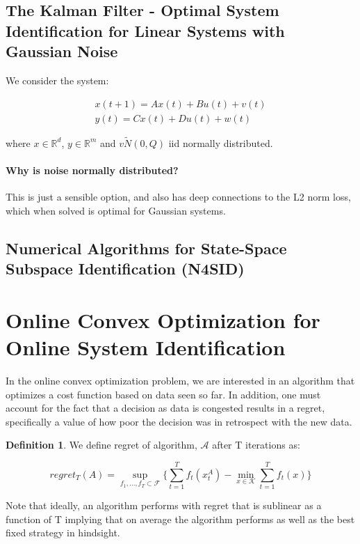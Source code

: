 \documentclass{article}
\theoremstyle{definition}
\newtheorem{definition}{Definition}[section]
\theoremstyle{remark}
\theoremstyle{lemma}
\theoremstyle{theorem}
\theoremstyle{corollary}
\theoremstyle{property}
\begin{document}
	\subsection{The Kalman Filter - Optimal System Identification for Linear Systems with Gaussian Noise}
		We consider the system:

		\begin{align*} 
			x(t+1) = Ax(t) + Bu(t) + v(t) \\ 
			y(t) = Cx(t) + Du(t) + w(t)
		\end{align*}

		where $x \in \mathbb{R}^d$, $y \in \mathbb{R}^m$ and $v \tilde N(0, Q)$ iid normally distributed. 

		\paragraph{Why is noise normally distributed?}
		This is just a sensible option, and also has deep connections to the L2 norm loss, which when solved is optimal for Gaussian systems.

	\subsection{Numerical Algorithms for State-Space Subspace Identification (N4SID)}

\section{Online Convex Optimization for Online System Identification}
	In the online convex optimization problem, we are interested in an algorithm that optimizes a cost function based on data seen so far. In addition, one must account for the fact that a decision as data is congested results in a regret, specifically a value of how poor the decision was in retrospect with the new data.

	\begin{definition}
	\label{def:regret}
		We define regret of algorithm, $\mathcal{A}$ after T iterations as:

			$$regret_T(A) = \sup_{f_1 ,..., f_T \subset \mathcal{F}} \{ \sum_{t=1}^T f_t(x_t^A) - \min_{x \in \mathcal{K}} \sum_{t=1}^T f_t(x)\}$$
	\end{definition}

	Note that ideally, an algorithm performs with regret that is sublinear as a function of T implying that on average the algorithm performs as well as the best fixed strategy in hindsight.
\end{document}
